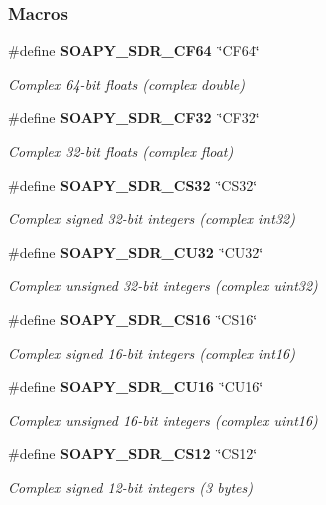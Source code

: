 \subsubsection*{Macros}
\begin{DoxyCompactItemize}
\item 
\#define {\bf S\+O\+A\+P\+Y\+\_\+\+S\+D\+R\+\_\+\+C\+F64}~\char`\"{}C\+F64\char`\"{}
\begin{DoxyCompactList}\small\item\em Complex 64-\/bit floats (complex double) \end{DoxyCompactList}\item 
\#define {\bf S\+O\+A\+P\+Y\+\_\+\+S\+D\+R\+\_\+\+C\+F32}~\char`\"{}C\+F32\char`\"{}
\begin{DoxyCompactList}\small\item\em Complex 32-\/bit floats (complex float) \end{DoxyCompactList}\item 
\#define {\bf S\+O\+A\+P\+Y\+\_\+\+S\+D\+R\+\_\+\+C\+S32}~\char`\"{}C\+S32\char`\"{}
\begin{DoxyCompactList}\small\item\em Complex signed 32-\/bit integers (complex int32) \end{DoxyCompactList}\item 
\#define {\bf S\+O\+A\+P\+Y\+\_\+\+S\+D\+R\+\_\+\+C\+U32}~\char`\"{}C\+U32\char`\"{}
\begin{DoxyCompactList}\small\item\em Complex unsigned 32-\/bit integers (complex uint32) \end{DoxyCompactList}\item 
\#define {\bf S\+O\+A\+P\+Y\+\_\+\+S\+D\+R\+\_\+\+C\+S16}~\char`\"{}C\+S16\char`\"{}
\begin{DoxyCompactList}\small\item\em Complex signed 16-\/bit integers (complex int16) \end{DoxyCompactList}\item 
\#define {\bf S\+O\+A\+P\+Y\+\_\+\+S\+D\+R\+\_\+\+C\+U16}~\char`\"{}C\+U16\char`\"{}
\begin{DoxyCompactList}\small\item\em Complex unsigned 16-\/bit integers (complex uint16) \end{DoxyCompactList}\item 
\#define {\bf S\+O\+A\+P\+Y\+\_\+\+S\+D\+R\+\_\+\+C\+S12}~\char`\"{}C\+S12\char`\"{}
\begin{DoxyCompactList}\small\item\em Complex signed 12-\/bit integers (3 bytes) \end{DoxyCompactList}\item 

\end{DoxyCompactItemize}
